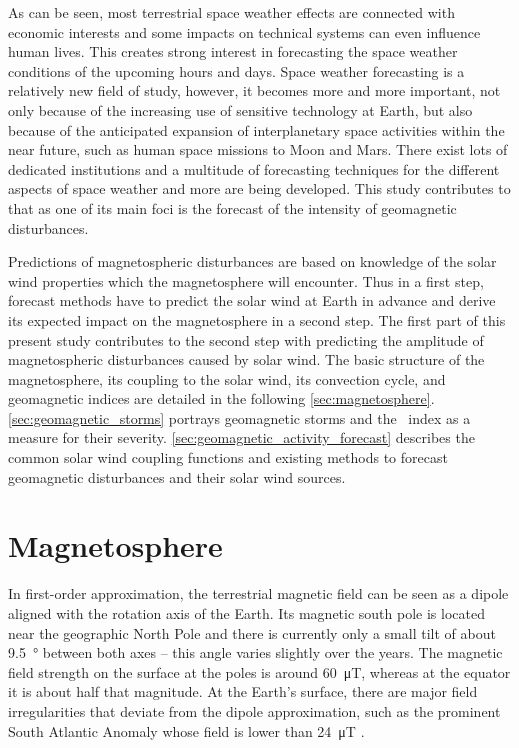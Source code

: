 As can be seen, most terrestrial space weather effects are connected with economic interests and some impacts on technical systems can even influence human lives. This creates strong interest in forecasting the space weather conditions of the upcoming hours and days. Space weather forecasting is a relatively new field of study, however, it becomes more and more important, not only because of the increasing use of sensitive technology at Earth, but also because of the anticipated expansion of interplanetary space activities within the near future, such as human space missions to Moon and Mars. There exist lots of dedicated institutions and a multitude of forecasting techniques for the different aspects of space weather and more are being developed. This study contributes to that as one of its main foci is the forecast of the intensity of geomagnetic disturbances.

Predictions of magnetospheric disturbances are based on knowledge of the solar wind properties which the magnetosphere will encounter. Thus in a first step, forecast methods have to predict the solar wind at Earth in advance and derive its expected impact on the magnetosphere in a second step. The first part of this present study contributes to the second step with predicting the amplitude of magnetospheric disturbances caused by solar wind. The basic structure of the magnetosphere, its coupling to the solar wind, its convection cycle, and geomagnetic indices are detailed in the following \autoref{sec:magnetosphere}. \autoref{sec:geomagnetic_storms} portrays geomagnetic storms and the \Kp~index as a measure for their severity. \autoref{sec:geomagnetic_activity_forecast} describes the common solar wind coupling functions and existing methods to forecast geomagnetic disturbances and their solar wind sources.


\section{Magnetosphere}
\label{sec:magnetosphere}
In first-order approximation, the terrestrial magnetic field can be seen as a dipole aligned with the rotation axis of the Earth. Its magnetic south pole is located near the geographic North Pole and there is currently only a small tilt of about \SI{9.5}{\degree} between both axes \citep{Thebault2015} -- this angle varies slightly over the years. The magnetic field strength on the surface at the poles is around \SI{60}{\micro\tesla}, whereas at the equator it is about half that magnitude. At the Earth's surface, there are major field irregularities that deviate from the dipole approximation, such as the prominent South Atlantic Anomaly whose field is lower than \SI{24}{\micro\tesla} \citep{Thebault2015}.

